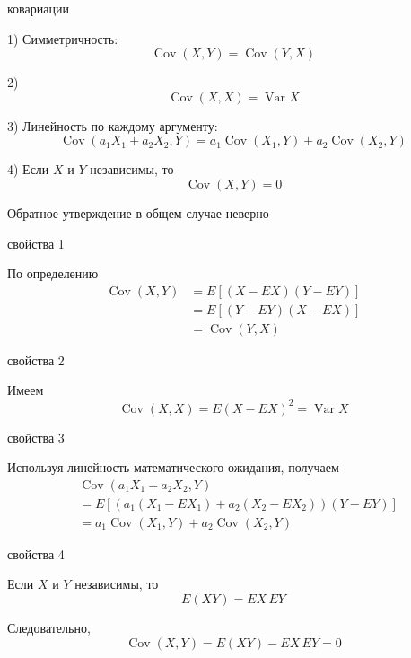 \documentclass[12pt,a4paper]{article}
\begin{document}
\begin{props}{ковариации}

1) Симметричность:
\[
\operatorname{Cov}(X,Y)
=
\operatorname{Cov}(Y,X)
\]

\medskip

2)
\[
\operatorname{Cov}(X,X)
=
\operatorname{Var}X
\]

\medskip

3) Линейность по каждому аргументу:
\[
\operatorname{Cov}(a_1X_1+a_2X_2,Y)
=
a_1\operatorname{Cov}(X_1,Y)
+
a_2\operatorname{Cov}(X_2,Y)
\]

\medskip

4) Если $X$ и $Y$ независимы, то
\[
\operatorname{Cov}(X,Y)=0
\]

Обратное утверждение в общем случае неверно

\end{props}

\begin{proofbox}{свойства 1}

По определению
\[
\begin{aligned}
\operatorname{Cov}(X,Y)
&=
E[(X-EX)(Y-EY)]\\
&=
E[(Y-EY)(X-EX)]\\
&=
\operatorname{Cov}(Y,X)
\end{aligned}
\]

\end{proofbox}

\begin{proofbox}{свойства 2}

Имеем
\[
\operatorname{Cov}(X,X)
=
E(X-EX)^2
=
\operatorname{Var}X
\]

\end{proofbox}

\begin{proofbox}{свойства 3}

Используя линейность математического ожидания, получаем
\[
\begin{aligned}
&\operatorname{Cov}(a_1X_1+a_2X_2,Y)\\
&=
E\left[
\left(
a_1(X_1-EX_1)+a_2(X_2-EX_2)
\right)(Y-EY)
\right]\\
&=
a_1\operatorname{Cov}(X_1,Y)
+
a_2\operatorname{Cov}(X_2,Y)
\end{aligned}
\]

\end{proofbox}

\begin{proofbox}{свойства 4}

Если $X$ и $Y$ независимы, то
\[
E(XY)=EX\,EY
\]

Следовательно,
\[
\operatorname{Cov}(X,Y)
=
E(XY)-EX\,EY
=
0
\]

\end{proofbox}
\end{document}
